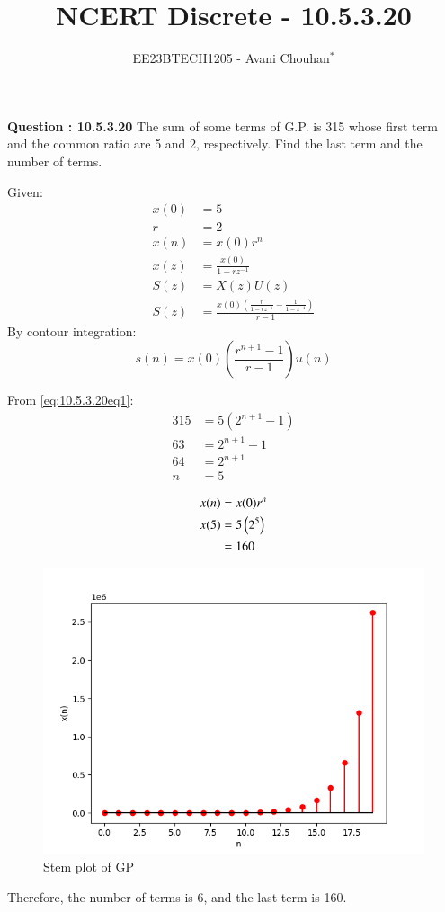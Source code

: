 \documentclass[journal,12pt,twocolumn]{IEEEtran}
\theoremstyle{remark}
\begin{document}

\vspace{3cm}

\title{NCERT Discrete - 10.5.3.20}
\author{EE23BTECH1205 - Avani Chouhan$^{*}$%
}
\maketitle
\newpage
\bigskip

\renewcommand{\thefigure}{\theenumi}
\renewcommand{\thetable}{\theenumi}

\vspace{3cm}
\textbf{Question : 10.5.3.20} 
The sum of some terms of G.P. is 315 whose first term and the common ratio are 5 and 2, respectively. Find the last term and the number of terms.\\
\solution

Given:
\begin{align}
x(0) &= 5 \\
r &= 2 \\
x(n) &= x(0)r^n\\
x(z) &= \frac{x(0)}{1-rz^{-1}}\\
S(z) &= X(z)U(z)\\
S(z) &= \frac{x(0)(\frac{r}{1-rz^{-1}}-\frac{1}{1-z^{-1}})}{r-1}
\end{align}
By contour integration:
\begin{equation}
s(n) = x(0)\left(\frac{r^{n+1}-1}{r-1}\right)u(n)
\label{eq:10.5.3.20eq1}
\end{equation}

From \eqref{eq:10.5.3.20eq1}:
\begin{align}
315 &= 5(2^{n+1}- 1)  \\
63 &= 2^{n+1}-1  \\
64 &= 2^{n+1} \\
n &= 5
\end{align}

\begin{align}
x(n) &= x(0)r^{n}\\
x(5) &= 5\left(2^{5}\right)\\
 &= 160 
\end{align}

\begin{figure}
    \centering
    \includegraphics[width=0.8\columnwidth]{figs/graph.png}
    \caption{Stem plot of GP}
    \label{fig:10.5.3.20fig1}
\end{figure}

Therefore, the number of terms is 6, and the last term is 160.
\end{document}
